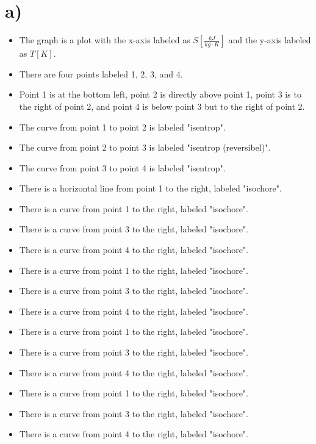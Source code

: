 

\section*{a)}

\begin{itemize}
    \item The graph is a plot with the x-axis labeled as \( S \left[ \frac{kJ}{kg \cdot K} \right] \) and the y-axis labeled as \( T [K] \).
    \item There are four points labeled 1, 2, 3, and 4.
    \item Point 1 is at the bottom left, point 2 is directly above point 1, point 3 is to the right of point 2, and point 4 is below point 3 but to the right of point 2.
    \item The curve from point 1 to point 2 is labeled "isentrop".
    \item The curve from point 2 to point 3 is labeled "isentrop (reversibel)".
    \item The curve from point 3 to point 4 is labeled "isentrop".
    \item There is a horizontal line from point 1 to the right, labeled "isochore".
    \item There is a curve from point 1 to the right, labeled "isochore".
    \item There is a curve from point 3 to the right, labeled "isochore".
    \item There is a curve from point 4 to the right, labeled "isochore".
    \item There is a curve from point 1 to the right, labeled "isochore".
    \item There is a curve from point 3 to the right, labeled "isochore".
    \item There is a curve from point 4 to the right, labeled "isochore".
    \item There is a curve from point 1 to the right, labeled "isochore".
    \item There is a curve from point 3 to the right, labeled "isochore".
    \item There is a curve from point 4 to the right, labeled "isochore".
    \item There is a curve from point 1 to the right, labeled "isochore".
    \item There is a curve from point 3 to the right, labeled "isochore".
    \item There is a curve from point 4 to the right, labeled "isochore".

\end{itemize}
